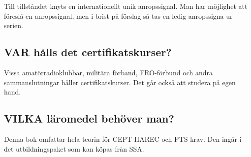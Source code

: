 Till tillståndet knyts en internationellt unik anropssignal. Man har möjlighet
att föreslå en anropssignal, men i brist på förslag så tas en ledig anropssigna
ur serien.

\subsection*{VAR hålls det certifikatskurser?}

Vissa amatörradioklubbar, militära förband, FRO-förbund och andra
sammanslutningar håller certifikatskurser.
Det går också att studera på egen hand.

\subsection*{VILKA läromedel behöver man?}

Denna bok omfattar hela teorin för CEPT HAREC och PTS krav.
Den ingår i det utbildningspaket som kan köpas från SSA.
